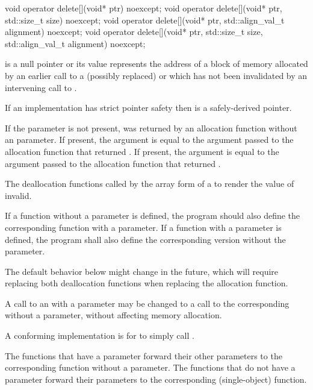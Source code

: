 %
\begin{itemdecl}
void operator delete[](void* ptr) noexcept;
void operator delete[](void* ptr, std::size_t size) noexcept;
void operator delete[](void* ptr, std::align_val_t alignment) noexcept;
void operator delete[](void* ptr, std::size_t size, std::align_val_t alignment) noexcept;
\end{itemdecl}

\begin{itemdescr}
\pnum
\expects
{} is a null pointer or
its value represents the address of
a block of memory allocated by
an earlier call to a (possibly replaced)
or
which has not been invalidated by an intervening call to
.

\pnum
If an implementation has strict pointer safety
then  is a safely-derived pointer.

\pnum
If the  parameter is not present,
 was returned by an allocation function
without an  parameter.
If present, the  argument
is equal to the  argument
passed to the allocation function that returned .
If present, the  argument
is equal to the  argument
passed to the allocation function that returned .

\pnum
\effects
The
deallocation functions
called by the array form of a
to render the value of  invalid.

\pnum
\replaceable
{}
If a function without a  parameter is defined,
the program should also define
the corresponding function with a  parameter.
If a function with a  parameter is defined,
the program shall also define
the corresponding version without the  parameter.
\begin{note}
The default behavior below might change in the future, which will require
replacing both deallocation functions when replacing the allocation function.
\end{note}

\pnum
\required
A call to an 
with a  parameter
may be changed to
a call to the corresponding 
without a  parameter,
without affecting memory allocation.
\begin{note}
A conforming implementation is for
 to simply call
.
\end{note}

\pnum
{}
The functions that have a  parameter
forward their other parameters
to the corresponding function without a  parameter.
The functions that do not have a  parameter
forward their parameters
to the corresponding  (single-object) function.
\end{itemdescr}

